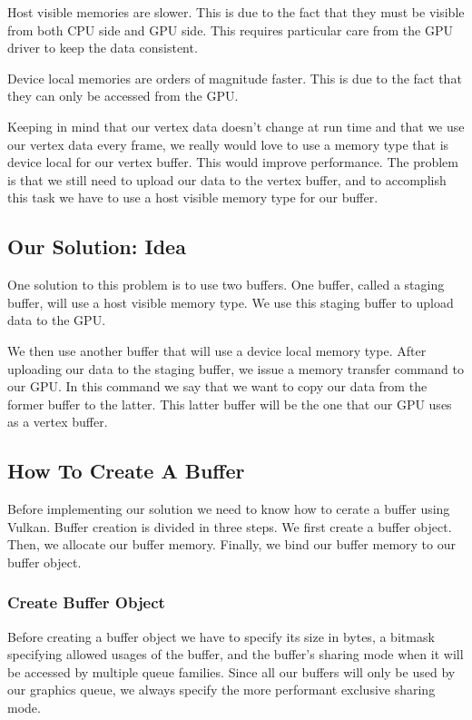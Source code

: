 Host visible memories are slower.
This is due to the fact that they must be visible from both CPU side and GPU side.
This requires particular care from the GPU driver to keep the data consistent.

Device local memories are orders of magnitude faster.
This is due to the fact that they can only be accessed from the GPU.

Keeping in mind that our vertex data doesn't change at run time and that
we use our vertex data every frame, we really would love to use a memory type
that is device local for our vertex buffer.
This would improve performance.
The problem is that we still need to upload our data to the vertex buffer,
and to accomplish this task we have to use a host visible memory type for our
buffer.

\subsection{Our Solution: Idea}

One solution to this problem is to use two buffers.
One buffer, called a staging buffer, will use a host visible memory type.
We use this staging buffer to upload data to the GPU.

We then use another buffer that will use a device local memory type.
After uploading our data to the staging buffer, we issue a memory transfer command
to our GPU.
In this command we say that we want to copy our data from the former buffer to
the latter.
This latter buffer will be the one that our GPU uses as a vertex buffer.

\subsection{How To Create A Buffer}

Before implementing our solution we need to know how to cerate a buffer using Vulkan.
Buffer creation is divided in three steps.
We first create a buffer object.
Then, we allocate our buffer memory.
Finally, we bind our buffer memory to our buffer object.

\subsubsection{Create Buffer Object}

Before creating a buffer object we have to specify its size in bytes, a bitmask
specifying allowed usages of the buffer, and the buffer's sharing mode
when it will be accessed by multiple queue families.
Since all our buffers will only be used by our graphics queue,
we always specify the more performant exclusive sharing mode.

